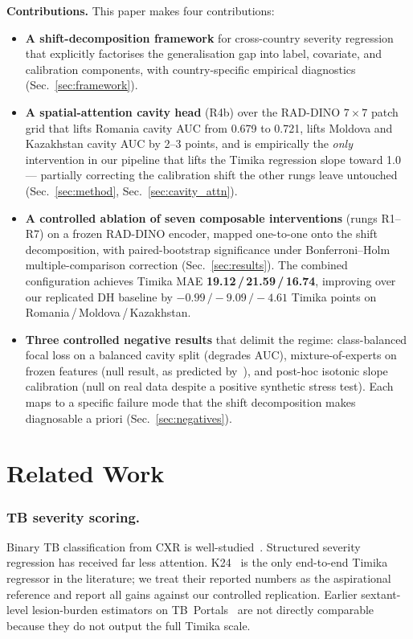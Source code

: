 \documentclass[runningheads]{llncs}
\begin{document}
\smallskip\noindent\textbf{Contributions.}
This paper makes four contributions:
\begin{itemize}
\item \textbf{A shift-decomposition framework} for cross-country severity regression that explicitly factorises the generalisation gap into label, covariate, and calibration components, with country-specific empirical diagnostics (Sec.~\ref{sec:framework}).

\item \textbf{A spatial-attention cavity head} (R4b) over the RAD-DINO $7{\times}7$ patch grid that lifts Romania cavity AUC from 0.679 to 0.721, lifts Moldova and Kazakhstan cavity AUC by 2--3 points, and is empirically the \emph{only} intervention in our pipeline that lifts the Timika regression slope toward 1.0 --- partially correcting the calibration shift the other rungs leave untouched (Sec.~\ref{sec:method}, Sec.~\ref{sec:cavity_attn}).

\item \textbf{A controlled ablation of seven composable interventions} (rungs R1--R7) on a frozen RAD-DINO encoder, mapped one-to-one onto the shift decomposition, with paired-bootstrap significance under Bonferroni--Holm multiple-comparison correction (Sec.~\ref{sec:results}). The combined configuration achieves Timika MAE \textbf{19.12\,/\,21.59\,/\,16.74}, improving over our replicated DH baseline by $-0.99\,/-9.09\,/-4.61$ Timika points on Romania\,/\,Moldova\,/\,Kazakhstan.

\item \textbf{Three controlled negative results} that delimit the regime: class-balanced focal loss on a balanced cavity split (degrades AUC), mixture-of-experts on frozen features (null result, as predicted by~\cite{gulrajani2021domainbed}), and post-hoc isotonic slope calibration (null on real data despite a positive synthetic stress test). Each maps to a specific failure mode that the shift decomposition makes diagnosable a priori (Sec.~\ref{sec:negatives}).
\end{itemize}

\section{Related Work}

\subsubsection{TB severity scoring.}
Binary TB classification from CXR is well-studied~\cite{liu2020tbx11k,jaeger2014shenzhen}. Structured severity regression has received far less attention. K24~\cite{kantipudi2024} is the only end-to-end Timika regressor in the literature; we treat their reported numbers as the aspirational reference and report all gains against our controlled replication. Earlier sextant-level lesion-burden estimators on TB~Portals~\cite{tbportals2020} are not directly comparable because they do not output the full Timika scale.
\end{document}
